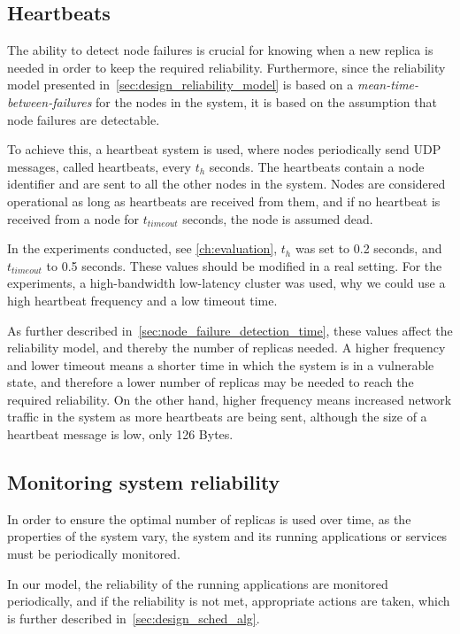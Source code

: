 \documentclass{cslthse-msc}
\begin{document}
\subsection{Heartbeats} \label{subsec:heartbeats}
The ability to detect node failures is crucial for knowing when a new replica is needed in order to keep the required reliability. Furthermore, since the reliability model presented in~\cref{sec:design_reliability_model} is based on a \emph{mean-time-between-failures} for the nodes in the system, it is based on the assumption that node failures are detectable. 

To achieve this, a heartbeat system is used, where nodes periodically send UDP messages, called heartbeats, every $t_h$ seconds. The heartbeats contain a node identifier and are sent to all the other nodes in the system. Nodes are considered operational as long as heartbeats are received from them, and if no heartbeat is received from a node for $t_{timeout}$ seconds, the node is assumed dead.

In the experiments conducted, see \cref{ch:evaluation}, $t_h$ was set to 0.2 seconds, and $t_{timeout}$ to 0.5 seconds. These values should be modified in a real setting. For the experiments, a high-bandwidth low-latency cluster was used, why we could use a high heartbeat frequency and a low timeout time.

As further described in~\cref{sec:node_failure_detection_time}, these values affect the reliability model, and thereby the number of replicas needed. A higher frequency and lower timeout means a shorter time in which the system is in a vulnerable state, and therefore a lower number of replicas may be needed to reach the required reliability. On the other hand, higher frequency means increased network traffic in the system as more heartbeats are being sent, although the size of a heartbeat message is low, only 126 Bytes.

\subsection{Monitoring system reliability} \label{subsec:monitoring_system_rel}
In order to ensure the optimal number of replicas is used over time, as the properties of the system vary, the system and its running applications or services must be periodically monitored. 

In our model, the reliability of the running applications are monitored periodically, and if the reliability is not met, appropriate actions are taken, which is further described in~\cref{sec:design_sched_alg}.
\end{document}
